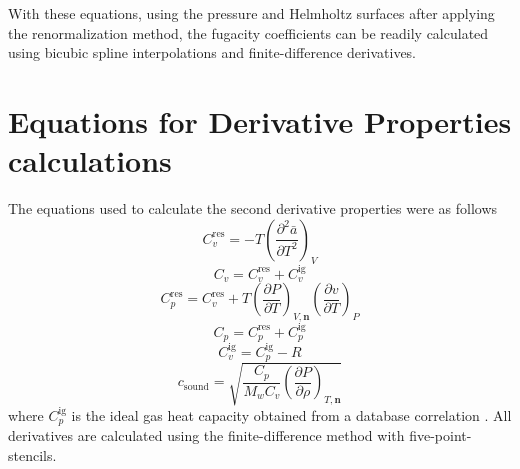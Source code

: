 \documentclass[preprint,12pt,3p]{elsarticle}
\begin{document}
\begin{appendices}
With these equations, using the pressure and Helmholtz surfaces after applying the renormalization method, the fugacity coefficients can be readily calculated using bicubic spline interpolations and finite-difference derivatives.

\setcounter{equation}{0}
\section{Equations for Derivative Properties calculations}

The equations used to calculate the second derivative properties were as follows
\begin{equation} \label{eq:Cvres_deriv}
C_{v}^\mathrm{res} = -T\left(\frac{\partial^{2}\bar{a}}{\partial T^{2}}\right)_{V}
\end{equation}
\begin{equation} \label{eq:Cv_deriv}
C_{v} = C_{v}^\mathrm{res} + C_{v}^\mathrm{ig}
\end{equation}
\begin{equation} \label{eq:Cpres_deriv}
C_{p}^\mathrm{res} = C_{v}^\mathrm{res} + T \left(\frac{\partial P}{\partial T}\right)_{V,\textbf{n}} \left(\frac{\partial v}{\partial T}\right)_{P}
\end{equation}
\begin{equation} \label{eq:Cp_deriv}
C_{p} = C_{p}^\mathrm{res} + C_{p}^\mathrm{ig}
\end{equation}
\begin{equation} \label{eq:Cvig_deriv}
C_{v}^\mathrm{ig} = C_{p}^\mathrm{ig} - R
\end{equation}
\begin{equation} \label{eq:u_deriv}
c_\mathrm{sound} = \sqrt{\frac{C_{p}}{M_{w} C_{v}}\left(\frac{\partial P}{\partial \rho}\right)_{T,\textbf{n}}}
\end{equation}
where $C_{p}^\mathrm{ig}$ is the ideal gas heat capacity obtained from a database correlation \cite{SmithVanNess}.
All derivatives are calculated using the finite-difference method with five-point-stencils.

\end{appendices}

%

\nocite{*}

\section*{\refname}


\end{document}
